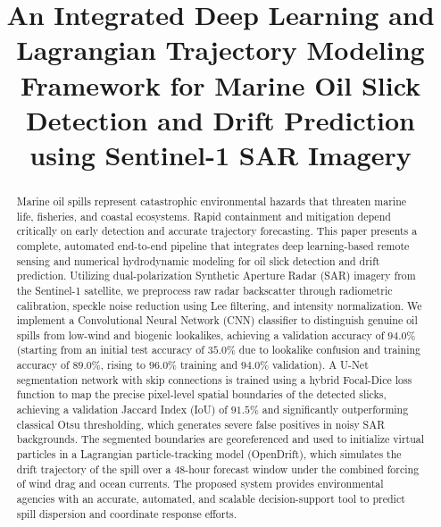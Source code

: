 \documentclass[conference]{IEEEtran}
\begin{document}
\title{An Integrated Deep Learning and Lagrangian Trajectory Modeling Framework for Marine Oil Slick Detection and Drift Prediction using Sentinel-1 SAR Imagery}

\author{
}

\maketitle

\begin{abstract}
Marine oil spills represent catastrophic environmental hazards that threaten marine life, fisheries, and coastal ecosystems. Rapid containment and mitigation depend critically on early detection and accurate trajectory forecasting. This paper presents a complete, automated end-to-end pipeline that integrates deep learning-based remote sensing and numerical hydrodynamic modeling for oil slick detection and drift prediction. Utilizing dual-polarization Synthetic Aperture Radar (SAR) imagery from the Sentinel-1 satellite, we preprocess raw radar backscatter through radiometric calibration, speckle noise reduction using Lee filtering, and intensity normalization. We implement a Convolutional Neural Network (CNN) classifier to distinguish genuine oil spills from low-wind and biogenic lookalikes, achieving a validation accuracy of $94.0\%$ (starting from an initial test accuracy of $35.0\%$ due to lookalike confusion and training accuracy of $89.0\%$, rising to $96.0\%$ training and $94.0\%$ validation). A U-Net segmentation network with skip connections is trained using a hybrid Focal-Dice loss function to map the precise pixel-level spatial boundaries of the detected slicks, achieving a validation Jaccard Index (IoU) of $91.5\%$ and significantly outperforming classical Otsu thresholding, which generates severe false positives in noisy SAR backgrounds. The segmented boundaries are georeferenced and used to initialize virtual particles in a Lagrangian particle-tracking model (OpenDrift), which simulates the drift trajectory of the spill over a 48-hour forecast window under the combined forcing of wind drag and ocean currents. The proposed system provides environmental agencies with an accurate, automated, and scalable decision-support tool to predict spill dispersion and coordinate response efforts.
\end{abstract}
\end{document}
